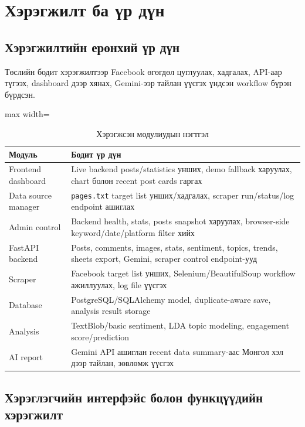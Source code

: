 \chapter{Хэрэгжилт ба үр дүн}
\label{Chapter5}

\section{Хэрэгжилтийн ерөнхий үр дүн}

Төслийн бодит хэрэгжилтээр Facebook өгөгдөл цуглуулах, хадгалах, API-аар түгээх, dashboard дээр хянах, Gemini-ээр тайлан үүсгэх үндсэн workflow бүрэн бүрдсэн.

\begin{table}[H]
\centering
\caption{Хэрэгжсэн модулиудын нэгтгэл}
\small
\renewcommand{\arraystretch}{1.25}
\begin{adjustbox}{max width=\textwidth}
\begin{tabular}{|p{3.6cm}|p{9.8cm}|}
\hline
\rowcolor{gray!20}\textbf{Модуль} & \textbf{Бодит үр дүн} \\
\hline
Frontend dashboard & Live backend posts/statistics унших, demo fallback харуулах, chart болон recent post cards гаргах \\
\hline
Data source manager & \texttt{pages.txt} target list унших/хадгалах, scraper run/status/log endpoint ашиглах \\
\hline
Admin control & Backend health, stats, posts snapshot харуулах, browser-side keyword/date/platform filter хийх \\
\hline
FastAPI backend & Posts, comments, images, stats, sentiment, topics, trends, sheets export, Gemini, scraper control endpoint-ууд \\
\hline
Scraper & Facebook target list унших, Selenium/BeautifulSoup workflow ажиллуулах, log file үүсгэх \\
\hline
Database & PostgreSQL/SQLAlchemy model, duplicate-aware save, analysis result storage \\
\hline
Analysis & TextBlob/basic sentiment, LDA topic modeling, engagement score/prediction \\
\hline
AI report & Gemini API ашиглан recent data summary-аас Монгол хэл дээр тайлан, зөвлөмж үүсгэх \\
\hline
\end{tabular}
\end{adjustbox}
\normalsize
\end{table}

\section{Хэрэглэгчийн интерфэйс болон функцүүдийн хэрэгжилт}

